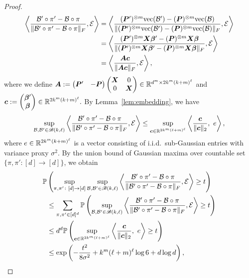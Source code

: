 \documentclass[12pt]{article}
\theoremstyle{definition}
\def\caliB{\mathscr{B}}
\begin{document}
\begin{proof}
\begin{align}
   \left\langle {\mathcal{B}'\circ \pi'-\mathcal{B}\circ \pi \over \lVert\mathcal{B}'\circ \pi'-\mathcal{B}\circ \pi\rVert_F}, \mathcal{E} \right \rangle &=  \left\langle {(\bm{P}')^{\otimes m}\text{vec}(\mathcal{B}')-(\bm{P})^{\otimes m}\text{vec}(\mathcal{B}) \over \lVert(\bm{P}')^{\otimes m}\text{vec}(\mathcal{B}')-(\bm{P})^{\otimes m}\text{vec}(\mathcal{B})\rVert_F}, \mathcal{E} \right \rangle\\
    &=\left\langle {(\bm{P}')^{\otimes m}\bm X\boldsymbol{\beta}'-(\bm{P})^{\otimes m}\bm X\boldsymbol{\beta}\over \lVert(\bm{P}')^{\otimes m}\bm X\boldsymbol{\beta}'-(\bm{P})^{\otimes m}\bm X\boldsymbol{\beta}\rVert_F}, \mathcal{E} \right \rangle\\&=
     \left\langle {\bm A\bm{c}\over \lVert\bm A\bm{c}\rVert_F}, \mathcal{E} \right \rangle,
\end{align}
where we define $\bm A := \begin{pmatrix}\bm{P}' &-\bm{P}\end{pmatrix}\begin{pmatrix}\bm X & 0\\ 0&\bm X\end{pmatrix}\in\mathbb{R}^{d^m\times 2k^m(k+m)^\ell}$ and $\bm{c}:=\begin{pmatrix} \boldsymbol{\beta}'\\\boldsymbol{\beta}\end{pmatrix}\in\mathbb{R}^{2k^m(k+m)^\ell}.$
By Lemma~\ref{lem:embedding}, we have 
\begin{align}\label{eq:embedding}
\sup_{\tB, \tB'\in \caliB(k,\ell)} \left\langle {\tB'\circ \pi'-\tB\circ \pi \over \FnormSize{}{\tB'\circ \pi'-\tB\circ \pi}}, \tE \right \rangle \leq \sup_{\mc\in \bbR^{2k^m(\ell+m)^\ell } }\left\langle {\mc\over \vnormSize{}{\mc}},\ e \right\rangle,
\end{align}
where  $e\in\mathbb{R}^{2k^m(k+m)^\ell}$ is a vector consisting of i.i.d.\ sub-Gaussian entries with variance proxy $\sigma^2$. 
By the union bound of Gaussian maxima over countable set $\{\pi,\pi'\colon [d]\to[d]\}$, we obtain
\begin{align}\label{eq:union}
    \mathbb{P}&\left(\sup_{\pi, \pi'\colon[d]\to[d]}\sup_{\tB, \tB'\in \caliB(k,\ell)} \left\langle {\tB'\circ \pi'-\tB\circ \pi \over \FnormSize{}{\tB'\circ \pi'-\tB\circ \pi}}, \tE \right \rangle\geq t\right)\\
    &\leq \sum_{\pi,\pi'\in[d]^d}\mathbb{P}\left(\sup_{\tB, \tB'\in \caliB(k,\ell)} \left\langle {\tB'\circ \pi'-\tB\circ \pi \over \FnormSize{}{\tB'\circ \pi'-\tB\circ \pi}}, \tE \right \rangle\geq t\right)\\
    &\leq d^d\mathbb{P}\left( \sup_{\mc\in \bbR^{2k^m(\ell+m)^\ell } }\left\langle {\mc\over \vnormSize{}{\mc}},\ e \right\rangle\geq t\right)\\&\leq \exp\left(-\frac{t^2}{8\sigma^2} +k^m(\ell+m)^\ell\log 6 + d\log d\right),

\end{align}
\end{proof}
\end{document}
